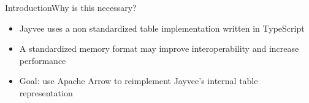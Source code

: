 \begin{frame}[t]{Introduction}{Why is this necessary?}
	\begin{itemize}
		\item Jayvee uses a non standardized table implementation written in TypeScript
		\item A standardized memory format may improve interoperability and increase performance
		\item Goal: use Apache Arrow to reimplement Jayvee's internal table representation
	\end{itemize}
\end{frame}
